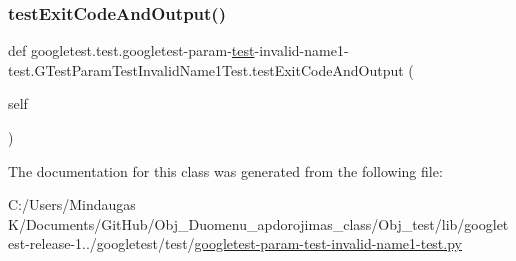 \subsubsection{\texorpdfstring{testExitCodeAndOutput()}{testExitCodeAndOutput()}}
{\footnotesize\ttfamily def googletest.\+test.\+googletest-\/param-\/\mbox{\hyperlink{_mutual_8h_a707ee03719e99670bf6cfdfd897b8456}{test}}-\/invalid-\/name1-\/test.\+G\+Test\+Param\+Test\+Invalid\+Name1\+Test.\+test\+Exit\+Code\+And\+Output (\begin{DoxyParamCaption}\item[{}]{self }\end{DoxyParamCaption})}



The documentation for this class was generated from the following file\+:\begin{DoxyCompactItemize}
\item 
C\+:/\+Users/\+Mindaugas K/\+Documents/\+Git\+Hub/\+Obj\+\_\+\+Duomenu\+\_\+apdorojimas\+\_\+class/\+Obj\+\_\+test/lib/googletest-\/release-\/1../googletest/test/\mbox{\hyperlink{_obj__test_2lib_2googletest-release-1_88_81_2googletest_2test_2googletest-param-test-invalid-name1-test_8py}{googletest-\/param-\/test-\/invalid-\/name1-\/test.\+py}}\end{DoxyCompactItemize}
